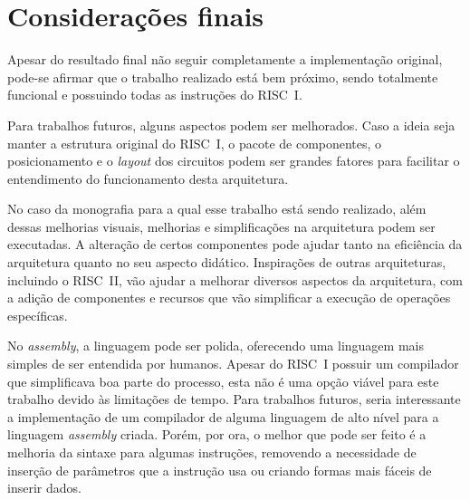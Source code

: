 \documentclass[
	article,			%
	11pt,				%
	oneside,			%
	a4paper,			%
	english,			%
	brazil,				%
	sumario=tradicional
	]{abntex2}
\begin{document}
% 

\section*{Considerações finais}

Apesar do resultado final não seguir completamente a implementação original, pode-se afirmar que o trabalho realizado está bem próximo, sendo totalmente funcional e possuindo todas as instruções do RISC~I.

Para trabalhos futuros, alguns aspectos podem ser melhorados. Caso a ideia seja manter a estrutura original do RISC~I, o pacote de componentes, o posicionamento e o \textit{layout} dos circuitos podem ser grandes fatores para facilitar o entendimento do funcionamento desta arquitetura.

No caso da monografia para a qual esse trabalho está sendo realizado, além dessas melhorias visuais, melhorias e simplificações na arquitetura podem ser executadas. A alteração de certos componentes pode ajudar tanto na eficiência da arquitetura quanto no seu aspecto didático. Inspirações de outras arquiteturas, incluindo o RISC~II, vão ajudar a melhorar diversos aspectos da arquitetura, com a adição de componentes e recursos que vão simplificar a execução de operações específicas.

No \textit{assembly}, a linguagem pode ser polida, oferecendo uma linguagem mais simples de ser entendida por humanos. Apesar do RISC~I possuir um compilador que simplificava boa parte do processo, esta não é uma opção viável para este trabalho devido às limitações de tempo. Para trabalhos futuros, seria interessante a implementação de um compilador de alguma linguagem de alto nível para a linguagem \textit{assembly} criada. Porém, por ora, o melhor que pode ser feito é a melhoria da sintaxe para algumas instruções, removendo a necessidade de inserção de parâmetros que a instrução usa ou criando formas mais fáceis de inserir dados.


\postextual



\emptythanks
\end{document}
